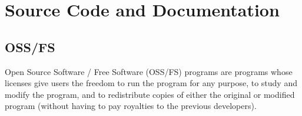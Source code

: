 
\section{Source Code and Documentation}

\subsection{OSS/FS}

Open Source Software / Free Software (OSS/FS) programs are programs whose
licenses give users the freedom to run the program for any purpose, to study
and modify the program, and to redistribute copies of either the original or
modified program (without having to pay royalties to the previous
developers)\cite{why-oss-fs}.


